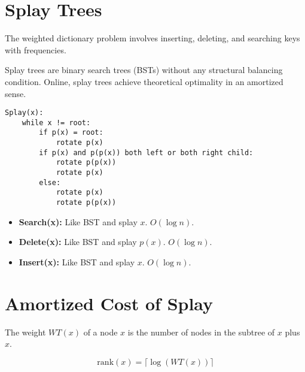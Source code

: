 \section{Splay Trees}
\begin{definition}
The weighted dictionary problem involves inserting, deleting, and searching keys with frequencies.
\end{definition}

\begin{intuition}
Splay trees are binary search trees (BSTs) without any structural balancing condition. Online, splay trees achieve theoretical optimality in an amortized sense.
\end{intuition}

\begin{lstlisting}
Splay(x):
    while x != root:
        if p(x) = root:
            rotate p(x)
        if p(x) and p(p(x)) both left or both right child:
            rotate p(p(x))
            rotate p(x)
        else:
            rotate p(x)
            rotate p(p(x))
\end{lstlisting}

\begin{itemize}
    \item \textbf{Search(x):} Like BST and splay $x$. $O(\log n)$.
    \item \textbf{Delete(x):} Like BST and splay $p(x)$. $O(\log n)$.
    \item \textbf{Insert(x):} Like BST and splay $x$. $O(\log n)$.
\end{itemize}

\section{Amortized Cost of Splay}

\begin{definition}
The weight $WT(x)$ of a node $x$ is the number of nodes in the subtree of $x$ plus $x$.
\end{definition}

\begin{equation*}
\text{rank}(x) = \lceil \log(WT(x)) \rceil
\end{equation*}